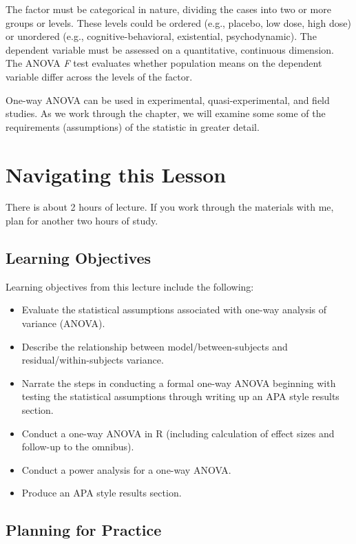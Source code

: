 \documentclass[
  11pt,
]{book}
\providecommand{\tightlist}{%
  \setlength{\itemsep}{0pt}\setlength{\parskip}{0pt}}
\begin{document}
The factor must be categorical in nature, dividing the cases into two or more groups or levels. These levels could be ordered (e.g., placebo, low dose, high dose) or unordered (e.g., cognitive-behavioral, existential, psychodynamic). The dependent variable must be assessed on a quantitative, continuous dimension. The ANOVA \emph{F} test evaluates whether population means on the dependent variable differ across the levels of the factor.

One-way ANOVA can be used in experimental, quasi-experimental, and field studies. As we work through the chapter, we will examine some some of the requirements (assumptions) of the statistic in greater detail.

\hypertarget{navigating-this-lesson-5}{%
\section{Navigating this Lesson}\label{navigating-this-lesson-5}}

There is about 2 hours of lecture. If you work through the materials with me, plan for another two hours of study.

\hypertarget{learning-objectives-5}{%
\subsection{Learning Objectives}\label{learning-objectives-5}}

Learning objectives from this lecture include the following:

\begin{itemize}
\tightlist
\item
  Evaluate the statistical assumptions associated with one-way analysis of variance (ANOVA).
\item
  Describe the relationship between model/between-subjects and residual/within-subjects variance.
\item
  Narrate the steps in conducting a formal one-way ANOVA beginning with testing the statistical assumptions through writing up an APA style results section.
\item
  Conduct a one-way ANOVA in R (including calculation of effect sizes and follow-up to the omnibus).
\item
  Conduct a power analysis for a one-way ANOVA.
\item
  Produce an APA style results section.
\end{itemize}

\hypertarget{planning-for-practice-4}{%
\subsection{Planning for Practice}\label{planning-for-practice-4}}
\end{document}
